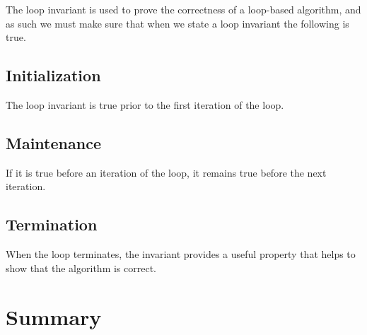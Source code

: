The loop invariant is used to prove the correctness of a loop-based algorithm,
and as such we must make sure that when we state a loop invariant the
following is true.

\subsection{Initialization}
The loop invariant is true prior to the first iteration of the loop.

\subsection{Maintenance}
If it is true before an iteration of the loop, it remains true before the next
iteration.

\subsection{Termination}
When the loop terminates, the invariant provides a useful property that helps
to show that the algorithm is correct.

\section{Summary}
\label{ch:definitions|sec:asymptotic-notation|sec:summary}

